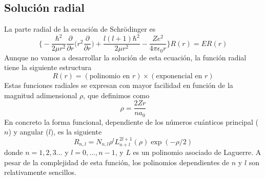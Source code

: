 \subsection{Solución radial}
La parte radial de la ecuación de Schrödinger es
\begin{equation}
    \bigg\{-\frac{\hbar^2}{2\mu r^2}\frac{\partial}{\partial r}\bigg(r^2\frac{\partial}{\partial r}\bigg) 
    +  \frac{l(l+1)\hbar^2}{2\mu r^2}
    - \frac{Ze^2}{4\pi \epsilon_0r}  \bigg\}
    R(r)
    = ER(r)
\end{equation}
Aunque no vamos a desarrollar la solución de esta ecuación, la función
radial tiene la siguiente estructura
\begin{equation}
    R(r)=(\textrm{polinomio en }r)\times(\textrm{exponencial en }r)
\end{equation}
Estas funciones radiales se expresan con mayor facilidad 
en función de la magnitud adimensional $\rho$, que definimos como
\begin{equation}
    \rho = \frac{2Zr}{na_0}
\end{equation}
En concreto la forma funcional, dependiente de los números
cuánticos principal ($n$) y angular ($l$), es la siguiente
\begin{equation}
  R_{n,l} = N_{n,l}\rho^l L^{2l+1}_{n+l}(\rho)\exp(-\rho/2)
\end{equation}
donde $n=1,2,3...$ y $l=0,...,n-1$, y $L$ es un polinomio
asociado de Laguerre. A pesar de la complejidad de esta función,
los polinomios dependientes de $n$ y $l$ son relativamente
sencillos. 

